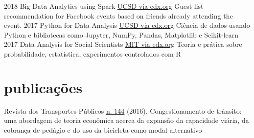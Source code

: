 \documentclass[]{friggeri-cv}
\begin{document}
\begin{entrylist}
  \entry
    {2018}
    {Big Data Analytics using Spark}
    {\href{https://www.edx.org/course/big-data-analytics-using-spark-uc-san-diego-dse230x}{UCSD via edx.org}}
    {Guest list recommendation for Facebook events based on friends already attending the event.}
  \entry
    {2017}
    {Python for Data Analysis}
    {\href{https://www.edx.org/course/python-data-science-uc-san-diego-dse200x}{UCSD via edx.org}}
    {Ciência de dados usando Python e bibliotecas como Jupyter, NumPy, Pandas, Matplotlib e Scikit-learn}
  \entry
    {2017}
    {Data Analysis for Social Scientists}
    {\href{https://www.edx.org/course/data-analysis-social-scientists-mitx-14-310x-2}{MIT via edx.org}}
    {Teoria e prática sobre probabilidade, estatística, experimentos controlados com R}
\end{entrylist}

\section{publicações}

Revista dos Transportes Públicos \href{http://files.antp.org.br/2016/12/21/rtp-144-e\_1.pdf}{n. 144} (2016). Congestionamento de trânsito: uma abordagem de teoria econômica acerca da expansão da capacidade viária, da cobrança de pedágio e do uso da bicicleta como modal alternativo

% 
\end{document}
